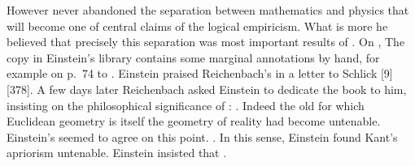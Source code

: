 \documentclass[draft]{article}
\begin{document}


However never abandoned the separation between mathematics and physics that will become one of central claims of the logical empiricism. What is more he believed that precisely this separation was most important results of \rt. On ,  The copy in Einstein's library contains some marginal annotations by hand, for example  on p.\ 74 to . Einstein praised Reichenbach's  in a letter to Schlick [9][378]. A few days later Reichenbach asked Einstein to dedicate the book to him, insisting on the philosophical significance of \rt:  . Indeed the old \apr for which Euclidean geometry is itself the geometry of reality  had become untenable. Einstein's seemed to agree on this point. . In this sense, Einstein found Kant's apriorism untenable. Einstein insisted that . 

\end{document}
